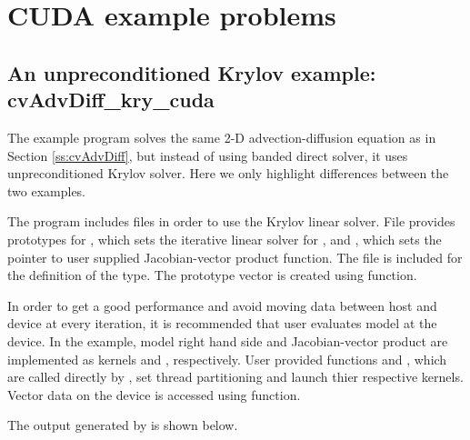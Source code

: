 \section{CUDA example problems}\label{s:ex_cuda}



\subsection{An unpreconditioned Krylov example: cvAdvDiff\_kry\_cuda}\label{ss:cvAdvDiff_cuda}

The example program  solves the same 2-D 
advection-diffusion equation as in Section \ref{ss:cvAdvDiff}, but
instead of using banded direct solver, it uses unpreconditioned 
Krylov solver. Here we only highlight differences between the two 
examples. 

The  program includes files
 in order to use the {\spgmr}
Krylov linear solver. File  provides prototypes for 
, which sets the iterative linear solver for
{\cvode}, and , which sets the pointer to user
supplied Jacobian-vector product function.
The file  is included for the definition of the {\cuda}
 type. The prototype vector is created
using  function. 

In order to get a good performance and avoid moving data between host
and device at every iteration, it is recommended that user evaluates  
model at the device. In the example, model right hand side and Jacobian-vector
product are implemented as {\cuda} kernels  and ,
respectively. User provided {\CC} functions  and , which are called
directly by {\cvode}, set thread partitioning and launch thier respective 
{\cuda} kernels. Vector data on the device is accessed using 
 function.

The output generated by  is shown below.



